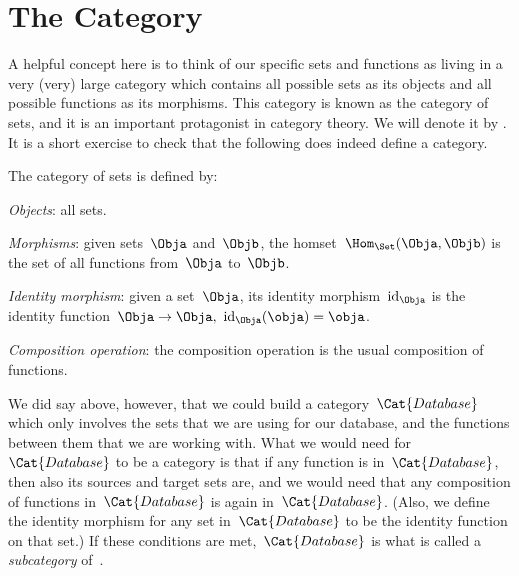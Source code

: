 \section{The Category \Set}

A helpful concept here is to think of our specific sets and functions as living in a very (very) large category which contains all possible sets as its objects and all possible functions as its morphisms. This category is known as the category of sets, and it is an important protagonist in category theory. We will denote it by \Set. It is a short exercise to check that the following does indeed define a category.

\begin{ctdefinition}
    The category of sets \iindex{\Set} is defined by:
    \begin{compactenum}
        \item \emph{Objects}: all sets.
        \item \emph{Morphisms}: given sets~$\Obja$ and~$\Objb$, the homset~$\Hom_\Set(\Obja,\Objb)$ is the set of all functions from~$\Obja$ to~$\Objb$.
        \item \emph{Identity morphism}: given a set~$\Obja$, its identity morphism~$\text{id}_\Obja$ is the identity function~$\Obja \to \Obja, \ \text{id}_\Obja(\obja) = \obja$.
        \item \emph{Composition operation}: the composition operation is the usual composition of functions.
    \end{compactenum}
\end{ctdefinition}

We did say above, however, that we could build a category~$\Cat{Database}$ which only involves the sets that we are using for our database, and the functions between them that we are working with. What we would need for~$\Cat{Database}$ to be a category is that if any function is in~$\Cat{Database}$, then also its sources and target sets are, and we would need that any composition of functions in~$\Cat{Database}$ is again in~$\Cat{Database}$. (Also, we define the identity morphism for any set in~$\Cat{Database}$ to be the identity function on that set.) If these conditions are met,~$\Cat{Database}$ is what is called a \emph{subcategory} of~\Set.
